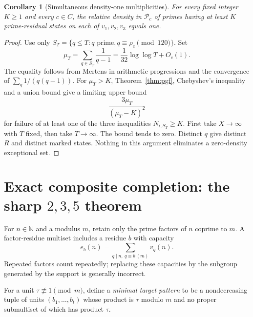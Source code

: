 \documentclass[11pt]{article}
\newtheorem{corollary}[theorem]{Corollary}
\theoremstyle{remark}\newtheorem{remark}[theorem]{Remark}
\newcommand{\N}{\mathbb N}
\newcommand{\Pcal}{\mathcal P}
\begin{document}
\begin{corollary}[Simultaneous density-one multiplicities]\label{cor:many}
For every fixed integer $K\ge1$ and every $c\in C$, the relative density in $\Pcal_c$ of primes having at least $K$ prime-residual states on each of $v_1,v_2,v_3$ equals one.
\end{corollary}
\begin{proof}
Use only $S_T=\{q\le T:q\text{ prime},q\equiv\rho_c\pmod{120}\}$. Set
\[
 \mu_T=\sum_{q\in S_T}\frac1{q-1}
       =\frac1{32}\log\log T+O_c(1).
\]
The equality follows from Mertens in arithmetic progressions and the convergence of $\sum_q1/(q(q-1))$. For $\mu_T>K$, Theorem~\ref{thm:pgf}, Chebyshev's inequality and a union bound give a limiting upper bound
\begin{equation}\label{eq:cheb}
 \frac{3\mu_T}{(\mu_T-K)^2}
\end{equation}
for failure of at least one of the three inequalities $N_{i,S_T}\ge K$. First take $X\to\infty$ with $T$ fixed, then take $T\to\infty$. The bound tends to zero. Distinct $q$ give distinct $R$ and distinct marked states. Nothing in this argument eliminates a zero-density exceptional set.
\end{proof}

\section{Exact composite completion: the sharp \texorpdfstring{$2,3,5$}{2,3,5} theorem}\label{sec:completion}
For $n\in\N$ and a modulus $m$, retain only the prime factors of $n$ coprime to $m$. A factor-residue multiset includes a residue $b$ with capacity
\[
 e_b(n)=\sum_{q\mid n,\ q\equiv b\ (m)}v_q(n).
\]
Repeated factors count repeatedly; replacing these capacities by the subgroup generated by the support is generally incorrect.

For a unit $\tau\not\equiv1\pmod m$, define a \emph{minimal target pattern} to be a nondecreasing tuple of units $(b_1,\ldots,b_t)$ whose product is $\tau$ modulo $m$ and no proper submultiset of which has product $\tau$.
\end{document}
